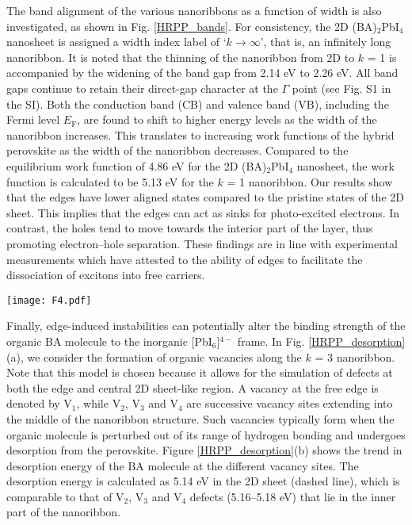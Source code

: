 \documentclass[aps,prl,preprint,11pt,superscriptaddress,bibnotes,amsmath,amssymb,amsfonts,showkeys]{revtex4-2}
\begin{document}
The band alignment of the various nanoribbons as a function of width is also investigated, as shown in Fig. \ref{HRPP_bands}. For consistency, the 2D (BA)$_2$PbI$_4$ nanosheet is assigned a width index label of `$k \rightarrow \infty$', that is, an infinitely long nanoribbon. It is noted that the thinning of the nanoribbon from 2D to $k$ = 1 is accompanied by the widening of the band gap from 2.14 eV to 2.26 eV. All band gaps continue to retain their direct-gap character at the $\Gamma$ point (see Fig. S1 in the SI). Both the conduction band (CB) and valence band (VB), including the Fermi level $E_{\text{F}}$, are found to shift to higher energy levels as the width of the nanoribbon increases. This translates to increasing work functions of the hybrid perovskite as the width of the nanoribbon decreases. Compared to the equilibrium work function of 4.86 eV for the 2D (BA)$_2$PbI$_4$ nanosheet, the work function is calculated to be 5.13 eV for the $k$ = 1 nanoribbon. Our results show that the edges have lower aligned states compared to the pristine states of the 2D sheet. This implies that the edges can act as sinks for photo-excited electrons. In contrast, the holes tend to move towards the interior part of the layer, thus promoting electron--hole separation. These findings are in line with experimental measurements which have attested to the ability of edges to facilitate the dissociation of excitons into free carriers.\cite{BTles17,ZTrevcon19,SDhumid19}

\begin{figure*}
\texttt{[image: F4.pdf]}
\caption{Valence (pink) and conduction (grey) bands of $k$ = 1, 2, 3 nanoribbons and the 2D nanosheet ($k \rightarrow \infty$), aligned relative to the vacuum level $E_{\text{vac}}$. The Fermi level $E_{\text{F}}$ for each system is marked in blue. \label{HRPP_bands}}
\end{figure*}

Finally, edge-induced instabilities can potentially alter the binding strength of the organic BA molecule to the inorganic [PbI$_6$]$^{4-}$ frame. In Fig. \ref{HRPP_desorption}(a), we consider the formation of organic vacancies along the $k$ = 3 nanoribbon. Note that this model is chosen because it allows for the simulation of defects at both the edge and central 2D sheet-like region. A vacancy at the free edge is denoted by V$_1$, while V$_2$, V$_3$ and V$_4$ are successive vacancy sites extending into the middle of the nanoribbon structure. Such vacancies typically form when the organic molecule is perturbed out of its range of hydrogen bonding and undergoes desorption from the perovskite. Figure \ref{HRPP_desorption}(b) shows the trend in desorption energy of the BA molecule at the different vacancy sites. The desorption energy is calculated as 5.14 eV in the 2D sheet (dashed line), which is comparable to that of V$_2$, V$_3$ and V$_4$ defects (5.16--5.18 eV) that lie in the inner part of the nanoribbon.
\end{document}
